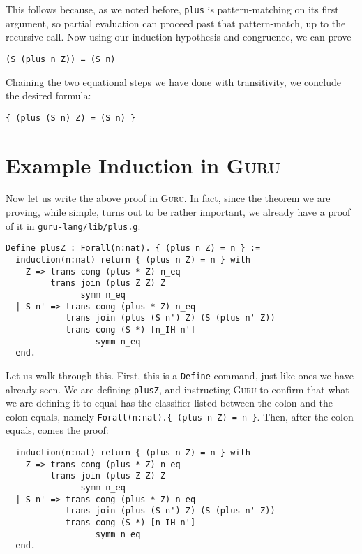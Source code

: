 \documentclass{book}[12pt]
\newcommand{\guru}[0]{\textsc{Guru}\xspace}
\begin{document}
\noindent This follows because, as we noted before, \texttt{plus} is
pattern-matching on its first argument, so partial evaluation can
proceed past that pattern-match, up to the recursive call. Now using
our induction hypothesis and congruence, we can prove

\begin{verbatim}
(S (plus n Z)) = (S n)
\end{verbatim}

\noindent Chaining the two equational steps we have done with transitivity,
we conclude the desired formula:
\begin{verbatim}
{ (plus (S n) Z) = (S n) }
\end{verbatim}

\section{Example Induction in \guru}
\label{ch4:indguru}

Now let us write the above proof in \guru.  In fact, since the theorem
we are proving, while simple, turns out to be rather important, we
already have a proof of it in \texttt{guru-lang/lib/plus.g}:

\begin{verbatim}
Define plusZ : Forall(n:nat). { (plus n Z) = n } :=
  induction(n:nat) return { (plus n Z) = n } with
    Z => trans cong (plus * Z) n_eq
         trans join (plus Z Z) Z
               symm n_eq
  | S n' => trans cong (plus * Z) n_eq
            trans join (plus (S n') Z) (S (plus n' Z))
            trans cong (S *) [n_IH n']
                  symm n_eq
  end.
\end{verbatim}

\noindent Let us walk through this.  First, this is a
\texttt{Define}-command, just like ones we have already seen.  We are
defining \texttt{plusZ}, and instructing \guru to confirm that what we
are defining it to equal has the classifier listed between the colon
and the colon-equals, namely \texttt{Forall(n:nat).\{ (plus n Z) = n
\}}.  Then, after the colon-equals, comes the proof:

\begin{verbatim}
  induction(n:nat) return { (plus n Z) = n } with
    Z => trans cong (plus * Z) n_eq
         trans join (plus Z Z) Z
               symm n_eq
  | S n' => trans cong (plus * Z) n_eq
            trans join (plus (S n') Z) (S (plus n' Z))
            trans cong (S *) [n_IH n']
                  symm n_eq
  end.
\end{verbatim}
\end{document}
